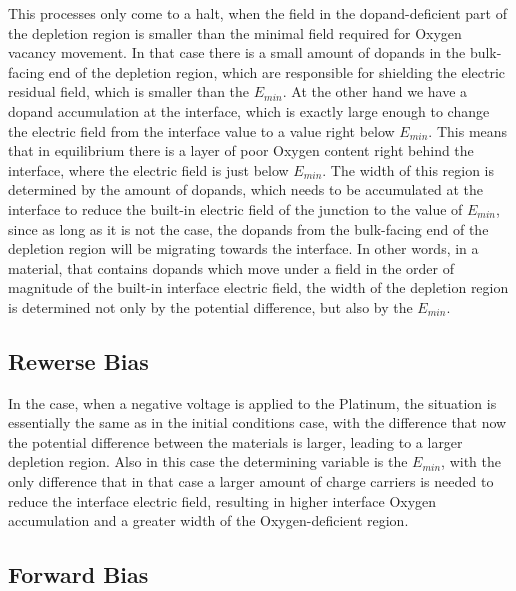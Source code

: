 \documentclass[12pt]{article}
\begin{document}
		This processes only come to a halt, when the field in the dopand-deficient part of the depletion region is smaller than the minimal field required for Oxygen vacancy movement. In that case there is a small amount of dopands in the bulk-facing end of the depletion region, which are responsible for shielding the electric residual field, which is smaller than the $E_{min}$. At the other hand we have a dopand accumulation at the interface, which is exactly large enough to change the electric field from the interface value to a value right below $E_{min}$. This means that in equilibrium there is a layer of poor Oxygen content right behind the interface, where the electric field is just below $E_{min}$. The width of this region is determined by the amount of dopands, which needs to be accumulated at the interface to reduce the built-in electric field of the junction to the value of $E_{min}$, since as long as it is not the case, the dopands from the bulk-facing end of the depletion region will be migrating towards the interface. In other words, in a material, that contains dopands which move under a field in the order of magnitude of the built-in interface electric field, the width of the depletion region is determined not only by the potential difference, but also by the $E_{min}$.
		
		\subsection{Rewerse Bias}
		In the case, when a negative voltage is applied to the Platinum, the situation is essentially the same as in the initial conditions case, with the difference that now the potential difference between the materials is larger, leading to a larger depletion region. Also in this case the determining variable is the $E_{min}$, with the only difference that in that case a larger amount of charge carriers is needed to reduce the interface electric field, resulting in higher interface Oxygen accumulation and a greater width of the Oxygen-deficient region.
		
		
		
		
		
		\subsection{Forward Bias}
		
		
		
		
		
\end{document}
